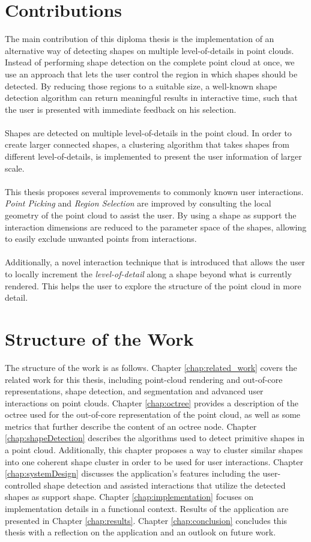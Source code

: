 \section{Contributions}

The main contribution of this diploma thesis is the implementation of an alternative way of detecting shapes on multiple level-of-details in point clouds. Instead of performing shape detection on the complete point cloud at once, we use an approach that lets the user control the region in which shapes should be detected. By reducing those regions to a suitable size, a well-known shape detection algorithm can return meaningful results in interactive time, such that the user is presented with immediate feedback on his selection. 
\\
\\
Shapes are detected on multiple level-of-details in the point cloud. In order to create larger connected shapes, a clustering algorithm that takes shapes from different level-of-details, is implemented to present the user information of larger scale. 
\\
\\ 
This thesis proposes several improvements to commonly known user interactions. \textit{Point Picking} and \textit{Region Selection} are improved by consulting the local geometry of the point cloud to assist the user. By using a shape as support the interaction dimensions are reduced to the parameter space of the shapes, allowing to easily exclude unwanted points from interactions. 
\\
\\
Additionally,  a novel interaction technique that is introduced that allows the user to locally increment the \textit{level-of-detail} along a shape beyond what is currently rendered. This helps the user to explore the structure of the point cloud in more detail. 


\section{Structure of the Work}

The structure of the work is as follows. Chapter \ref{chap:related_work} covers the related work for this thesis, including point-cloud rendering and out-of-core representations, shape detection, and segmentation and advanced user interactions on point clouds. Chapter \ref{chap:octree} provides a description of the octree used for the out-of-core representation of the point cloud, as well as some metrics that further describe the content of an octree node. Chapter \ref{chap:shapeDetection} describes the algorithms used to detect primitive shapes in a point cloud. Additionally, this chapter proposes a way to cluster similar shapes into one coherent shape cluster in order to be used for user interactions. Chapter \ref{chap:systemDesign} discusses the application's features including the user-controlled shape detection and assisted interactions that utilize the detected shapes as support shape. Chapter \ref{chap:implementation} focuses on implementation details in a functional context. Results of the application are presented in Chapter \ref{chap:results}. Chapter \ref{chap:conclusion} concludes this thesis with a reflection on the application and an outlook on future work. 
